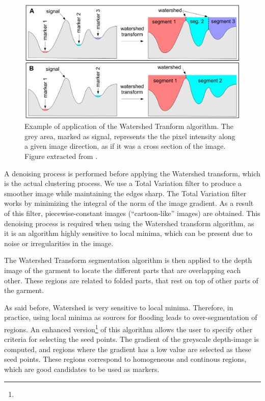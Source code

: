 \begin{figure}[thbp]
    \centering
    \includegraphics[width=\textwidth]
    {figures/watershed-example.png}
    \caption[Example of application of the Watershed Tranform algorithm]
    {Example of application of the Watershed Tranform algorithm. The grey area, marked as signal, represents the the pixel intensity along a given image direction, as if it was a cross section of the image. Figure extracted from \cite{rs6010776}.}
    \label{fig:watershed_example}
\end{figure}

A denoising process is performed before applying the Watershed transform, which is the actual clustering process. We use a Total Variation filter \cite{chambolle2004algorithm} to produce a smoother image while maintaining the edges sharp. The Total Variation filter works by minimizing the integral of the norm of the image gradient. As a result of this filter, piecewise-constant images (``cartoon-like'' images) are obtained. This denoising process is required when using the Watershed transform algorithm, as it is an algorithm highly sensitive to local minima, which can be present due to noise or irregularities in the image. 

The Watershed Transform segmentation algorithm is then applied to the depth image of the garment to locate the different parts that are overlapping each other. These regions are related to folded parts, that rest on top of other parts of the garment. 

\pagebreak
As said before, Watershed is very sensitive to local minima. Therefore, in practice, using local minima as sources for flooding leads to over-segmentation of regions. An enhanced version\footnote{} of this algorithm allows the user to specify other criteria for selecting the seed points. The gradient of the greyscale depth-image is computed, and regions where the gradient has a low value are selected as these seed points. These regions correspond to homogeneous and continous regions, which are good candidates to be used as markers.


